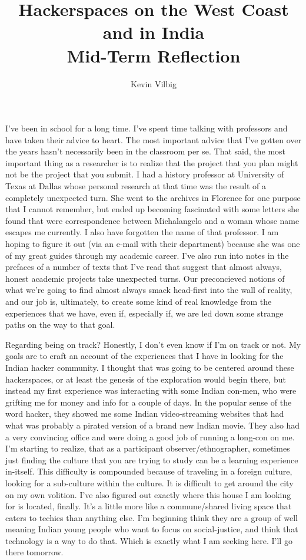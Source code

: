 \documentclass[12pt]{article}
\begin{document}
\title{Hackerspaces on the West Coast and in India \\ Mid-Term Reflection}
\author{Kevin Vilbig}
\maketitle

I've been in school for a long time. I've spent time talking with professors and have taken their advice to heart. The most important advice that I've gotten over the years hasn't necessarily been in the classroom per se.  That said, the most important thing as a researcher is to realize that the project that you plan might not be the project that you submit. I had a history professor at University of Texas at Dallas whose personal research at that time was the result of a completely unexpected turn. She went to the archives in Florence for one purpose that I cannot remember, but ended up becoming fascinated with some letters she found that were correspondence between Michalangelo and a woman whose name escapes me currently.  I also have forgotten the name of that professor.  I am hoping to figure it out (via an e-mail with their department) because she was one of my great guides through my academic career. I've also run into notes in the prefaces of a number of texts that I've read that suggest that almost always, honest academic projects take unexpected turns. Our preconcieved notions of what we're going to find almost always smack head-first into the wall of reality, and our job is, ultimately, to create some kind of real knowledge from the experiences that we have, even if, especially if, we are led down some strange paths on the way to that goal.

Regarding being on track? Honestly, I don't even know if I'm on track or not. My goals are to craft an account of the experiences that I have in looking for the Indian hacker community. I thought that was going to be centered around these hackerspaces, or at least the genesis of the exploration would begin there, but instead my first experience was interacting with some Indian con-men, who were grifting me for money and info for a couple of days. In the popular sense of the word hacker, they showed me some Indian video-streaming websites that had what was probably a pirated version of a brand new Indian movie. They also had a very convincing office and were doing a good job of running a long-con on me. I'm starting to realize, that as a participant observer/ethnographer, sometimes just finding the culture that you are trying to study can be a learning experience in-itself. This difficulty is compounded because of traveling in a foreign culture, looking for a sub-culture within the culture. It is difficult to get around the city on my own volition. I've also figured out exactly where this house I am looking for is located, finally. It's a little more like a commune/shared living space that caters to techies than anything else. I'm beginning think they are a group of well meaning Indian young people who want to focus on social-justice, and think that technology is a way to do that. Which is exactly what I am seeking here. I'll go there tomorrow.
\end{document}
